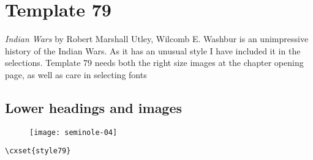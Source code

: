 \section{Template 79}

\emph{Indian Wars} by Robert Marshall Utley, Wilcomb E. Washbur is an unimpressive history of the Indian Wars. As it has an unusual style I have included it in the selections.
Template 79 needs both the right size images at the chapter opening page, as well as care in selecting fonts


\subsection{Lower headings and images}

\begin{figure}[ht]
\centering
\texttt{[image: seminole-04]}
\end{figure}

\begin{verbatim}
\cxset{style79}
\end{verbatim}







